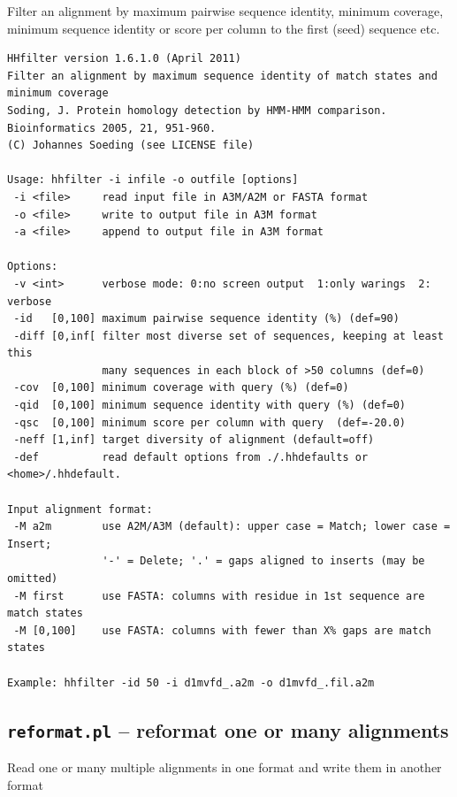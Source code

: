 \documentclass[11pt,a4paper]{article}
\begin{document}
Filter an alignment by maximum pairwise sequence identity, minimum coverage,
minimum sequence identity or score per column to the first (seed) sequence etc.

\small \begin{verbatim}
HHfilter version 1.6.1.0 (April 2011)
Filter an alignment by maximum sequence identity of match states and minimum coverage
Soding, J. Protein homology detection by HMM-HMM comparison. Bioinformatics 2005, 21, 951-960.
(C) Johannes Soeding (see LICENSE file)

Usage: hhfilter -i infile -o outfile [options]                  
 -i <file>     read input file in A3M/A2M or FASTA format                 
 -o <file>     write to output file in A3M format                         
 -a <file>     append to output file in A3M format                        

Options:                                                                  
 -v <int>      verbose mode: 0:no screen output  1:only warings  2: verbose
 -id   [0,100] maximum pairwise sequence identity (%) (def=90)   
 -diff [0,inf[ filter most diverse set of sequences, keeping at least this    
               many sequences in each block of >50 columns (def=0)
 -cov  [0,100] minimum coverage with query (%) (def=0) 
 -qid  [0,100] minimum sequence identity with query (%) (def=0) 
 -qsc  [0,100] minimum score per column with query  (def=-20.0)
 -neff [1,inf] target diversity of alignment (default=off)
 -def          read default options from ./.hhdefaults or <home>/.hhdefault. 

Input alignment format:                                                    
 -M a2m        use A2M/A3M (default): upper case = Match; lower case = Insert;
               '-' = Delete; '.' = gaps aligned to inserts (may be omitted)   
 -M first      use FASTA: columns with residue in 1st sequence are match states
 -M [0,100]    use FASTA: columns with fewer than X% gaps are match states   
                                                                          
Example: hhfilter -id 50 -i d1mvfd_.a2m -o d1mvfd_.fil.a2m      
\end{verbatim} \normalsize

\subsection{{\tt reformat.pl} -- reformat one or many alignments}

Read one or many multiple alignments in one format and write them in another format
\end{document}
